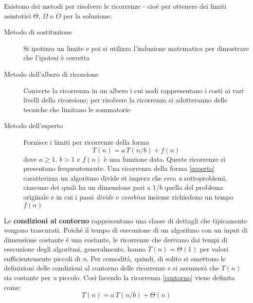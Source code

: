 \documentclass[10pt, a4paper]{report}
\begin{document}
Esistono dei metodi per risolvere le ricorrenze - cioè per ottenere dei limiti asintotici $\Theta$, $\Omega$ o $O$ per la soluzione:
\begin{description}
\item[Metodo di sostituzione] Si ipotizza un limite e poi si utilizza l'induzione matematica per dimostrare che l'ipotesi è corretta
\item[Metodo dell'albero di ricorsione] Converte la ricorrenza in un albero i cui nodi rappresentano i costi ai vari livelli della ricorsione; per risolvere la ricorrenza si adotteranno delle tecniche che limitano le sommatorie
\item[Metodo dell'esperto] Fornisce i limiti per ricorrenze della forma
\begin{equation}
T(n) = a\,T(n/b) + f(n)
\label{esperto}
\end{equation}
dove $a \geq 1$, $b > 1$ e $f(n)$ è una funzione data.$\;$Queste ricorrenze si presentano frequentemente. Una ricorrenza della forma \eqref{esperto} caratterizza un algoritmo divide et impera che crea \textit{a} sottoproblemi, ciascuno dei quali ha un dimensione pari a $1/b$ quella del problema originale e in cui i passi \textsl{divide} e \textsl{combina} insieme richiedono un tempo $f(n)$
\end{description}
Le \textbf{condizioni al contorno} rappresentano una classe di dettagli che tipicamente vengono trascurati. Poiché il tempo di esecuzione di un algoritmo con un input di dimensione costante è una costante, le ricorrenze che derivano dai tempi di esecuzione degli algoritmi, generalmente, hanno $T(n) = \Theta(1)$ per valori sufficientemente piccoli di \textit{n}. Per comodità, quindi, di solito si omettono le definizioni delle condizioni al contorno delle ricorrenze e si assumerà che $T(n)$ sia costante per \textit{n} piccolo. Così facendo la ricorrenza \eqref{contorno} viene definita come:
\begin{equation*}
T(n) = a\,T(n/b) + \Theta(n)
\end{equation*}
\end{document}
